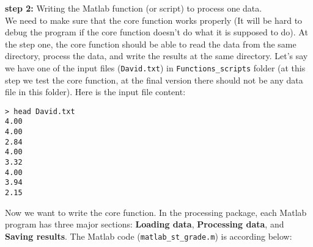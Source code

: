 
\textbf{step 2:} Writing the Matlab function (or script) to process one data. \\

\noindent
We need to make sure that the core function works properly (It will be hard to debug the program if the core function doesn't do what it is supposed to do). At the step one, the core function should be able to read the data from the same directory, process the data, and write the results at the same directory. Let's say we have one of the input files (\texttt{David.txt}) in \texttt{Functions\_scripts} folder (at this step we test the core function, at the final version there should not be any data file in this folder). Here is the input file content:

\begin{mdframed}[hidealllines=true,backgroundcolor=gray!20]
\begin{singlespace}
\fontsize{10pt}{1pt}
\texttt{> head David.txt \\
4.00 \\
4.00 \\
2.84 \\
4.00 \\
3.32 \\
4.00 \\
3.94 \\
2.15 
 }
\end{singlespace}
\end{mdframed}

\noindent
Now we want to write the core function. In the processing package, each Matlab program has three major sections: \textbf{Loading data}, \textbf{Processing data},  and \textbf{Saving results}. The Matlab code (\texttt{matlab\_st\_grade.m}) is according below:



